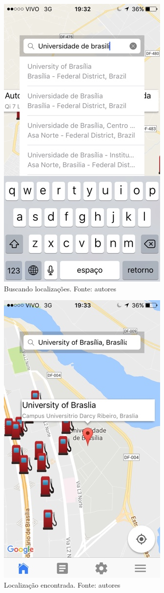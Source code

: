 \begin{figure}[H]
    \centering
    \includegraphics[scale=0.5]{figuras/app_3.jpg}
    \caption[Buscando localizações]{Buscando localizações. Fonte: autores}
    \label{img:buscando_localizacoes}
\end{figure}

\begin{figure}[H]
    \centering
    \includegraphics[scale=0.5]{figuras/app_4.jpg}
    \caption[Localização encontrada]{Localização encontrada. Fonte: autores}
    \label{img:localizacao_encontrada}
\end{figure}

